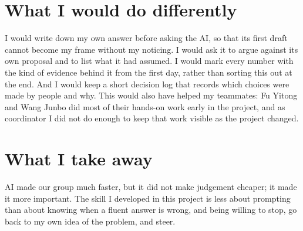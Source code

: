 \documentclass[11pt,a4paper]{article}
\begin{document}
\section{What I would do differently}

I would write down my own answer before asking the AI, so that its first draft cannot become my frame without my noticing. I would ask it to argue against its own proposal and to list what it had assumed. I would mark every number with the kind of evidence behind it from the first day, rather than sorting this out at the end. And I would keep a short decision log that records which choices were made by people and why. This would also have helped my teammates: Fu Yitong and Wang Junbo did most of their hands-on work early in the project, and as coordinator I did not do enough to keep that work visible as the project changed.

\section{What I take away}

AI made our group much faster, but it did not make judgement cheaper; it made it more important. The skill I developed in this project is less about prompting than about knowing when a fluent answer is wrong, and being willing to stop, go back to my own idea of the problem, and steer.
\end{document}
